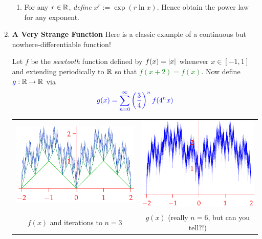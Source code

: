 \begin{exercises}{}
\begin{enumerate}
\begin{enumerate}
			\item For any $r\in\mathbb{R}$, \emph{define} $x^r:=\exp(r\ln x)$. Hence obtain the power law for any exponent.
   	\end{enumerate}
   	
   	
   	\goodbreak
   	
   	
  	\item\label{exs:strangefunction} \textbf{A Very Strange Function}\smallbreak
  	Here is a classic example of a continuous but nowhere-differentiable function!\smallbreak

		Let $f$ be the \emph{sawtooth} function defined by \textcolor{Green}{$f(x)=\left| x\right|$} whenever $x\in[-1,1]$ and extending periodically to $\mathbb{R}$ so that \textcolor{Green}{$f(x+2)=f(x)$}. Now define $\textcolor{blue}{g}:\mathbb{R}\to\mathbb{R}$ via
  	\[
  		\textcolor{blue}{g(x)=\sum_{n=0}^\infty \left(\frac 34\right)^nf(4^nx)}
  	\]
  	\vspace{-30pt}
	  \begin{center}
		  \begin{tabular}{c@{\qquad}c}
			  \includegraphics[scale=0.95]{sawtooth}
			  &
			  \includegraphics[scale=0.95]{sawtooth2}\\
			  $f(x)$ and iterations to $n=3$
			  &
			  $g(x)$ (really $n=6$, but can you tell?!)
		  \end{tabular}
	  \end{center}
  

\end{enumerate}
\end{exercises}
